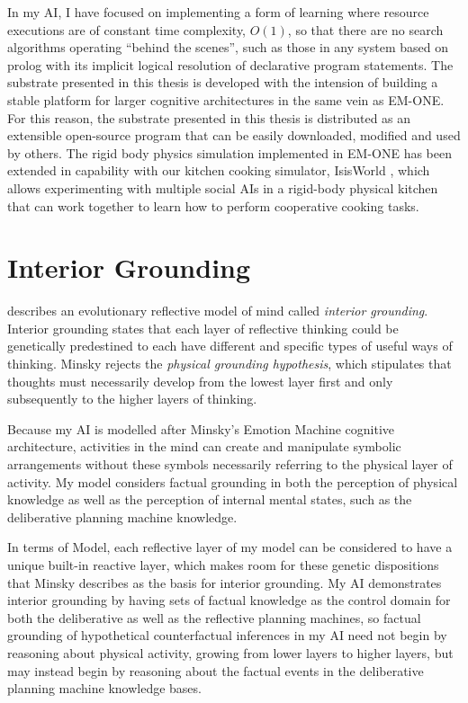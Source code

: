 In my AI, I have focused on implementing a form of learning where
resource executions are of constant time complexity, $O(1)$, so that
there are no search algorithms operating ``behind the scenes'', such
as those in any system based on prolog with its implicit logical
resolution of declarative program statements.  The substrate presented
in this thesis is developed with the intension of building a stable
platform for larger cognitive architectures in the same vein as
EM-ONE.  For this reason, the substrate presented in this thesis is
distributed as an extensible open-source program that can be easily
downloaded, modified and used by others.  The rigid body physics
simulation implemented in EM-ONE has been extended in capability with
our kitchen cooking simulator, IsisWorld \cite[]{smith:2010}, which
allows experimenting with multiple social AIs in a rigid-body physical
kitchen that can work together to learn how to perform cooperative
cooking tasks.

\section{Interior Grounding}

\cite{minsky:2005} describes an evolutionary reflective model of mind
called \emph{interior grounding}.  Interior grounding states that each
layer of reflective thinking could be genetically predestined to each
have different and specific types of useful ways of thinking.  Minsky
rejects the \emph{physical grounding hypothesis}, which stipulates
that thoughts must necessarily develop from the lowest layer first and
only subsequently to the higher layers of thinking.

Because my AI is modelled after Minsky's Emotion Machine cognitive
architecture, activities in the mind can create and manipulate
symbolic arrangements without these symbols necessarily referring to
the physical layer of activity.  My model considers factual grounding
in both the perception of physical knowledge as well as the perception
of internal mental states, such as the deliberative planning machine
knowledge.

In terms of Model, each reflective layer of my model can
be considered to have a unique built-in reactive layer, which makes
room for these genetic dispositions that Minsky describes as the basis
for interior grounding.  My AI demonstrates interior grounding by
having sets of factual knowledge as the control domain for both the
deliberative as well as the reflective planning machines, so factual
grounding of hypothetical counterfactual inferences in my AI need not
begin by reasoning about physical activity, growing from lower layers
to higher layers, but may instead begin by reasoning about the factual
events in the deliberative planning machine knowledge bases.

